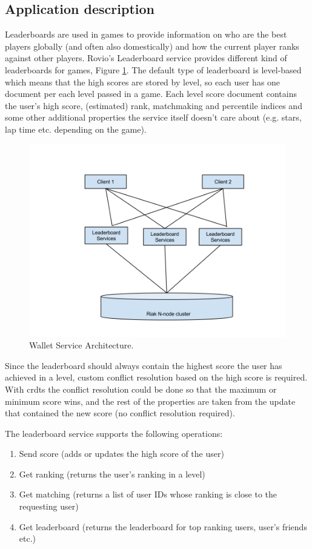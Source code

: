 \documentclass[11pt,a4paper]{report}
\begin{document}
\subsection{Application description}
Leaderboards are used in games to provide information on who are the best players globally (and often also domestically) and how the current player ranks against other players.
Rovio's Leaderboard service provides different kind of leaderboards for games, Figure \ref{fig:leaderboard_service}. The default type of leaderboard is level­-based which means that the high scores are stored by level, so each user has one document per each level passed in a game. Each level score document contains the user's high score, (estimated) rank, matchmaking and percentile indices and some other additional properties the service itself doesn't care about (e.g. stars, lap time etc. depending on the game).
\begin{figure}[!h]
	\centering
	\includegraphics[width=1\textwidth]{./img/Leaderboard.png}
	
	\caption{Wallet Service Architecture.}
	\label{fig:leaderboard_service}
\end{figure}

Since the leaderboard should always contain the highest score the user has achieved in a level, custom conflict resolution based on the high score is required. With \glspl{crdt} the conflict resolution could be done so that the maximum or minimum score wins, and the rest of the properties are taken from the update that contained the new score (no conflict resolution required).

The leaderboard service supports the following operations:
\begin{enumerate}
\item Send score (adds or updates the high score of the user)
\item Get ranking (returns the user's ranking in a level)
\item Get matching (returns a list of user IDs whose ranking is close to the requesting user)
\item Get leaderboard (returns the leaderboard for top ranking users, user's friends etc.)
\end{enumerate}
\end{document}
